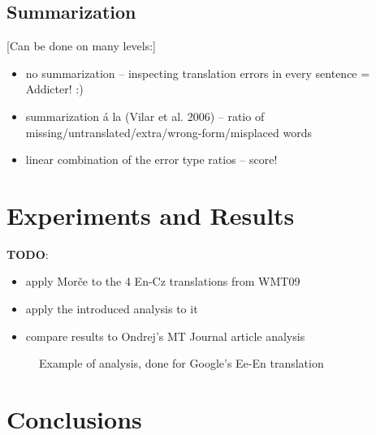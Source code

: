 \documentclass[11pt]{article}
\newcommand{\tmp}[1]{[#1]}
\newcommand{\todo}[0]{\textbf{TODO}}
\newcommand{\itemz}{\begin{itemize}}
\newcommand{\idone}{\end{itemize}}
\begin{document}
\subsection{Summarization}

\tmp{Can be done on many levels:}

\itemz
	\item no summarization -- inspecting translation errors in every sentence = Addicter! :)
	\item summarization á la (Vilar et al. 2006) -- ratio of missing/untranslated/extra/wrong-form/misplaced words
	\item linear combination of the error type ratios -- score!
\idone

\section{Experiments and Results}

\todo{}:

\itemz
	\item apply Mor\v{c}e to the 4 En-Cz translations from WMT09
	\item apply the introduced analysis to it
	\item compare results to Ondrej's MT Journal article analysis
\idone

\begin{figure*}

\caption{Example of analysis, done for Google's Ee-En translation}
\end{figure*}

\section{Conclusions}
\end{document}
